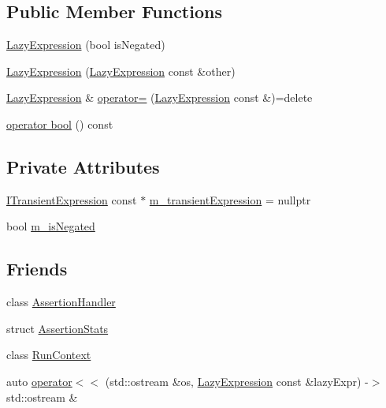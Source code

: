 \subsection*{Public Member Functions}
\begin{DoxyCompactItemize}
\item 
\hyperlink{class_catch_1_1_lazy_expression_a47186c2487bd4bf871e870ba8048553a}{Lazy\-Expression} (bool is\-Negated)
\item 
\hyperlink{class_catch_1_1_lazy_expression_ab82d5e94df0e159b018fbde0170e46f8}{Lazy\-Expression} (\hyperlink{class_catch_1_1_lazy_expression}{Lazy\-Expression} const \&other)
\item 
\hyperlink{class_catch_1_1_lazy_expression}{Lazy\-Expression} \& \hyperlink{class_catch_1_1_lazy_expression_ae4ae00d4f36f084c369f2da36565a822}{operator=} (\hyperlink{class_catch_1_1_lazy_expression}{Lazy\-Expression} const \&)=delete
\item 
\hyperlink{class_catch_1_1_lazy_expression_a5f3541ec933ad977b6a10ddf61b45adc}{operator bool} () const 
\end{DoxyCompactItemize}
\subsection*{Private Attributes}
\begin{DoxyCompactItemize}
\item 
\hyperlink{struct_catch_1_1_i_transient_expression}{I\-Transient\-Expression} const $\ast$ \hyperlink{class_catch_1_1_lazy_expression_a5a9ce4c2401a262c21b4e107551180bc}{m\-\_\-transient\-Expression} = nullptr
\item 
bool \hyperlink{class_catch_1_1_lazy_expression_a975fdfe2bb139512024bb479d478425e}{m\-\_\-is\-Negated}
\end{DoxyCompactItemize}
\subsection*{Friends}
\begin{DoxyCompactItemize}
\item 
class \hyperlink{class_catch_1_1_lazy_expression_a4301a3aa57b612dd8b6ef8461742ecab}{Assertion\-Handler}
\item 
struct \hyperlink{class_catch_1_1_lazy_expression_a64019eb137f5ce447cdc71cb80b6e7a4}{Assertion\-Stats}
\item 
class \hyperlink{class_catch_1_1_lazy_expression_af3aa096bb29a772bc534830f29a2ce7a}{Run\-Context}
\item 
auto \hyperlink{class_catch_1_1_lazy_expression_aa01086581cab2fcd2d4580b8fa787dfc}{operator$<$$<$} (std\-::ostream \&os, \hyperlink{class_catch_1_1_lazy_expression}{Lazy\-Expression} const \&lazy\-Expr) -\/$>$ std\-::ostream \&
\end{DoxyCompactItemize}


